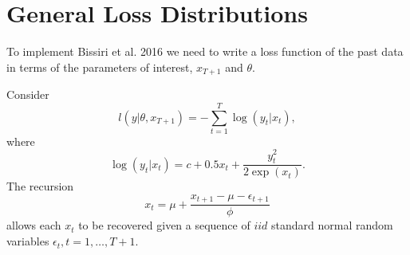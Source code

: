 \documentclass[12pt,a4paper]{article}%
\begin{document}
\section{General Loss Distributions}

To implement Bissiri et al. 2016 we need to write a loss function of the past data in terms of the parameters of interest, $x_{T+1}$ and  $\theta$.

Consider
\begin{equation}
\label{loss}
l(y | \theta, x_{T+1}) = -\sum_{t=1}^T \log(y_t | x_t),
\end{equation}
where
\begin{equation}
\label{lossyt}
\log(y_t | x_t) = c + 0.5x_t + \frac{y_t^2}{2 \exp(x_t)}.
\end{equation}
The recursion
\begin{equation}
\label{xRecursion}
x_t = \mu + \frac{x_{t+1} - \mu - \epsilon_{t+1}}{\phi}
\end{equation}
allows each $x_t$ to be recovered given a sequence of $iid$ standard normal random variables $\epsilon_t, t = 1, \dots, T+1$.
\end{document}
